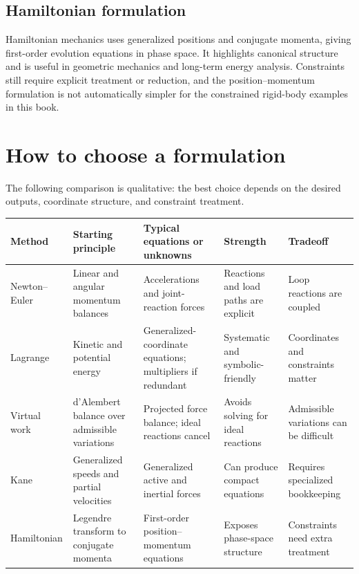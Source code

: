 \documentclass[../main.tex]{subfiles}
\begin{document}
\subsection{Hamiltonian formulation}

Hamiltonian mechanics uses generalized positions and conjugate momenta, giving first-order evolution equations in phase space. It highlights canonical structure and is useful in geometric mechanics and long-term energy analysis. Constraints still require explicit treatment or reduction, and the position--momentum formulation is not automatically simpler for the constrained rigid-body examples in this book.

\section{How to choose a formulation}

The following comparison is qualitative: the best choice depends on the desired outputs, coordinate structure, and constraint treatment.

\begin{center}
\small
\begin{tabular}{@{}>{\raggedright\arraybackslash}p{}@{}>{\raggedright\arraybackslash}p{}@{}>{\raggedright\arraybackslash}p{}@{}>{\raggedright\arraybackslash}p{}@{}>{\raggedright\arraybackslash}p{}@{}}
\toprule
Method & Starting principle & Typical equations or unknowns & Strength & Tradeoff \\
\midrule
Newton--Euler & Linear and angular momentum balances & Accelerations and joint-reaction forces & Reactions and load paths are explicit & Loop reactions are coupled \\
Lagrange & Kinetic and potential energy & Generalized-coordinate equations; multipliers if redundant & Systematic and symbolic-friendly & Coordinates and constraints matter \\
Virtual work & d'Alembert balance over admissible variations & Projected force balance; ideal reactions cancel & Avoids solving for ideal reactions & Admissible variations can be difficult \\
Kane & Generalized speeds and partial velocities & Generalized active and inertial forces & Can produce compact equations & Requires specialized bookkeeping \\
Hamiltonian & Legendre transform to conjugate momenta & First-order position--momentum equations & Exposes phase-space structure & Constraints need extra treatment \\
\bottomrule
\end{tabular}
\end{center}
\end{document}
